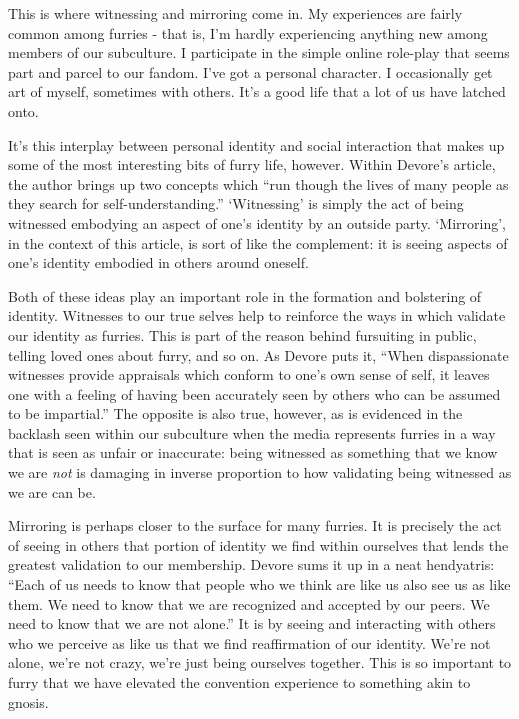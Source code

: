 This is where witnessing and mirroring come in. My experiences are
fairly common among furries - that is, I'm hardly experiencing anything
new among members of our subculture. I participate in the simple online
role-play that seems part and parcel to our fandom. I've got a personal
character. I occasionally get art of myself, sometimes with others. It's
a good life that a lot of us have latched onto.

It's this interplay between personal identity and social interaction
that makes up some of the most interesting bits of furry life, however.
Within Devore's article, the author brings up two concepts which ``run
though the lives of many people as they search for self-understanding.''
`Witnessing' is simply the act of being witnessed embodying an aspect of
one's identity by an outside party. `Mirroring', in the context of this
article, is sort of like the complement: it is seeing aspects of one's
identity embodied in others around oneself.

Both of these ideas play an important role in the formation and
bolstering of identity. Witnesses to our true selves help to reinforce
the ways in which validate our identity as furries. This is part of the
reason behind fursuiting in public, telling loved ones about furry, and
so on. As Devore puts it, ``When dispassionate witnesses provide
appraisals which conform to one's own sense of self, it leaves one with
a feeling of having been accurately seen by others who can be assumed to
be impartial.'' The opposite is also true, however, as is evidenced in
the backlash seen within our subculture when the media represents
furries in a way that is seen as unfair or inaccurate: being witnessed
as something that we know we are \emph{not} is damaging in inverse
proportion to how validating being witnessed as we are can be.

Mirroring is perhaps closer to the surface for many furries. It is
precisely the act of seeing in others that portion of identity we find
within ourselves that lends the greatest validation to our membership.
Devore sums it up in a neat hendyatris: ``Each of us needs to know that
people who we think are like us also see us as like them. We need to
know that we are recognized and accepted by our peers. We need to know
that we are not alone.'' It is by seeing and interacting with others who
we perceive as like us that we find reaffirmation of our identity. We're
not alone, we're not crazy, we're just being ourselves together. This is
so important to furry that we have elevated the convention experience to
something akin to gnosis.

